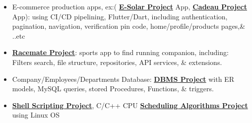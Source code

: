 



  \begin{itemize}[itemsep=0pt, parsep=0pt, topsep=0pt]
    \item{ \footnotesize E-commerce production apps, ex:( \textbf{\textcolor{cyan}{\href{https://play.google.com/store/apps/details?id=com.inova.esolar}{E-Solar Project}}} App, \textbf{\textcolor{cyan}{\href{https://play.google.com/store/apps/details?id=com.inova.cadeau}{Cadeau Project}}} App): using CI/CD pipelining, Flutter/Dart, including authentication, pagination, navigation, verification pin code, home/profile/products pages,\& ..etc}
    \item {\footnotesize \textbf{\textcolor{cyan}{\href{https://github.com/AsmaaJAH/race_app}{Racemate Project}}}: sports app to find running companion, including: Filters search, file structure, repositories, API services, \& extensions.}
   \end{itemize}



\begin{itemize}[itemsep=0pt, parsep=0pt, topsep=0pt]
  \item{ \footnotesize Company/Employees/Departments Database: \textbf{\textcolor{cyan}{\href{https://github.com/AsmaaJAH/database-management-system-and-SQL-language/tree/main/labs/lab\%203}{DBMS Project}}}  with ER models, MySQL queries, stored Procedures, Functions, \& triggers. }
  \item {\footnotesize  \textbf{\textcolor{cyan}{\href{https://github.com/AsmaaJAH/Basic_ubuntu_shell}{Shell Scripting Project}}},  C/C++ CPU \textbf{\textcolor{cyan}{\href{https://github.com/AsmaaJAH/FCFS-and-RR-CPU-Scheduling}{Scheduling Algorithms Project}}} using Linux OS }
 \end{itemize}


